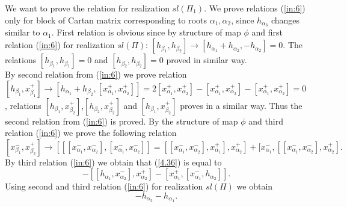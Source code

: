 \documentclass[english]{elsarticle}
\numberwithin{equation}{section}
\begin{document}
 

We want to prove the relation for realization $sl(\Pi_1)$. We prove relations (\ref{in:6}) only for block of Cartan matrix corresponding to roots $\alpha_1,\alpha_2$, since $h_{\alpha_3}$ changes similar to $\alpha_{1}$. First relation is obvious since by structure of map $\phi$ and first relation (\ref{in:6}) for realization $sl(\Pi)$: $[h_{\beta_1},h_{\beta_2}]\rightarrow [h_{\alpha_1}+h_{\alpha_2},-h_{\alpha_2}]=0$. The relations $[h_{\beta_1},h_{\beta_1}]=0$ and $[h_{\beta_2},h_{\beta_2}]=0$ proved in similar way.\\
By second relation from (\ref{in:6}) we prove relation $[h_{\beta_1},x_{\beta_1}^+]\rightarrow[h_{\alpha_1}+h_{\beta_2},[x_{\alpha_1}^+,x_{\alpha_2}^+]] = 2[x_{\alpha_1}^+,x_{\alpha_2}^+]-[x_{\alpha_1}^+,x_{\alpha_2}^+] - [x_{\alpha_1}^+,x_{\alpha_2}^+]=0$, relations $[h_{\beta_1},x_{\beta_2}^+]$,$[h_{\beta_2},x_{\beta_2}^+]$ and $[h_{\beta_1},x_{\beta_2}^+]$ proves in a similar way. Thus the second relation from (\ref{in:6}) is proved.
By the structure of map $\phi$ and third relation (\ref{in:6}) we prove the following relation
\begin{equation}\label{4.36}
[x_{\beta_1}^-,x_{\beta_2}^+]\rightarrow [[[x_{\alpha_1}^-,x_{\alpha_2}^-],[x_{\alpha_1}^-,x_{\alpha_2}^-]]= [[x_{\alpha_1}^-,x_{\alpha_2}^-],x_{\alpha_1}^+],x_{\alpha_2}^+] + [x_{\alpha_1}^-,[[x_{\alpha_1}^-,x_{\alpha_2}^-],x_{\alpha_2}^+].
\end{equation}
By third relation (\ref{in:6}) we obtain that (\ref{4.36}) is equal to
\begin{equation}
    -[[h_{\alpha_1},x_{\alpha_2}^-], x_{\alpha_2}^+]-[x_{\alpha_1}^+, [x_{\alpha_1}^-,h_{\alpha_2}]].
\end{equation}
Using second and third relation (\ref{in:6}) for realization $sl(\Pi)$ we obtain
\begin{equation}
    -h_{\alpha_2}-h_{\alpha_1}.
\end{equation}
\end{document}
